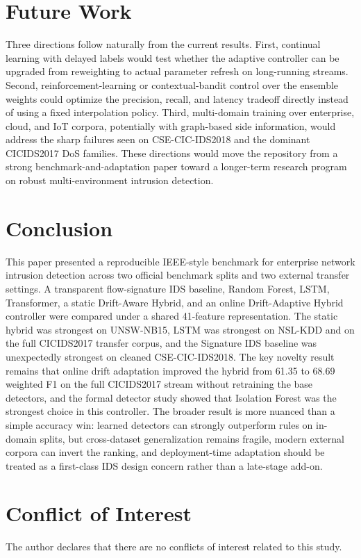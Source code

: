 \documentclass[conference]{IEEEtran}
\begin{document}
\section{Future Work}
Three directions follow naturally from the current results. First, continual learning with delayed labels would test whether the adaptive controller can be upgraded from reweighting to actual parameter refresh on long-running streams. Second, reinforcement-learning or contextual-bandit control over the ensemble weights could optimize the precision, recall, and latency tradeoff directly instead of using a fixed interpolation policy. Third, multi-domain training over enterprise, cloud, and IoT corpora, potentially with graph-based side information, would address the sharp failures seen on CSE-CIC-IDS2018 and the dominant CICIDS2017 DoS families. These directions would move the repository from a strong benchmark-and-adaptation paper toward a longer-term research program on robust multi-environment intrusion detection.

\section{Conclusion}
This paper presented a reproducible IEEE-style benchmark for enterprise network intrusion detection across two official benchmark splits and two external transfer settings. A transparent flow-signature IDS baseline, Random Forest, LSTM, Transformer, a static Drift-Aware Hybrid, and an online Drift-Adaptive Hybrid controller were compared under a shared 41-feature representation. The static hybrid was strongest on UNSW-NB15, LSTM was strongest on NSL-KDD and on the full CICIDS2017 transfer corpus, and the Signature IDS baseline was unexpectedly strongest on cleaned CSE-CIC-IDS2018. The key novelty result remains that online drift adaptation improved the hybrid from 61.35 to 68.69 weighted F1 on the full CICIDS2017 stream without retraining the base detectors, and the formal detector study showed that Isolation Forest was the strongest choice in this controller. The broader result is more nuanced than a simple accuracy win: learned detectors can strongly outperform rules on in-domain splits, but cross-dataset generalization remains fragile, modern external corpora can invert the ranking, and deployment-time adaptation should be treated as a first-class IDS design concern rather than a late-stage add-on.

\section*{Conflict of Interest}
The author declares that there are no conflicts of interest related to this study.

\balance


\end{document}
